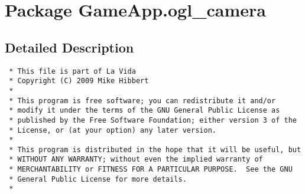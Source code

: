 \hypertarget{namespaceGameApp_1_1ogl__camera}{
\section{Package GameApp.ogl\_\-camera}
\label{namespaceGameApp_1_1ogl__camera}
}




\subsection{Detailed Description}


\footnotesize\begin{verbatim}
 * This file is part of La Vida
 * Copyright (C) 2009 Mike Hibbert
 *
 * This program is free software; you can redistribute it and/or
 * modify it under the terms of the GNU General Public License as
 * published by the Free Software Foundation; either version 3 of the
 * License, or (at your option) any later version.
 *
 * This program is distributed in the hope that it will be useful, but
 * WITHOUT ANY WARRANTY; without even the implied warranty of
 * MERCHANTABILITY or FITNESS FOR A PARTICULAR PURPOSE.  See the GNU
 * General Public License for more details.
 *
\end{verbatim}
\normalsize
 